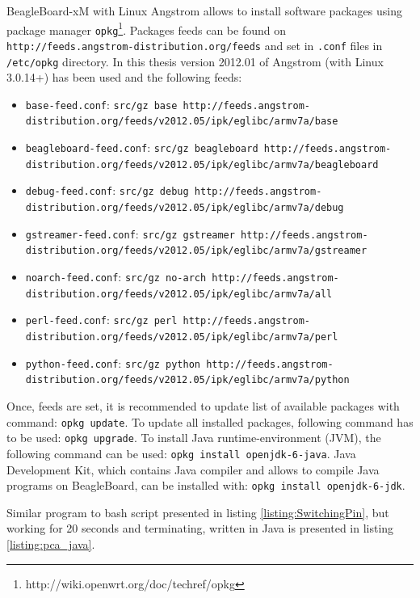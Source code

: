 BeagleBoard-xM with Linux Angstrom allows to install software packages using package manager \lstinline{opkg}\footnote{http://wiki.openwrt.org/doc/techref/opkg}. Packages feeds can be found on \lstinline{http://feeds.angstrom-distribution.org/feeds} and set in \lstinline{.conf} files in \lstinline{/etc/opkg} directory. In this thesis version 2012.01 of Angstrom (with Linux 3.0.14+) has been used and the following feeds:
\begin{itemize}
	\item \lstinline{base-feed.conf}: \lstinline{src/gz base http://feeds.angstrom-distribution.org/feeds/v2012.05/ipk/eglibc/armv7a/base}
	\item \lstinline{beagleboard-feed.conf}: \lstinline{src/gz beagleboard http://feeds.angstrom-distribution.org/feeds/v2012.05/ipk/eglibc/armv7a/beagleboard}
	\item \lstinline{debug-feed.conf}: \lstinline{src/gz debug http://feeds.angstrom-distribution.org/feeds/v2012.05/ipk/eglibc/armv7a/debug}
	\item \lstinline{gstreamer-feed.conf}: \lstinline{src/gz gstreamer http://feeds.angstrom-distribution.org/feeds/v2012.05/ipk/eglibc/armv7a/gstreamer}
	\item \lstinline{noarch-feed.conf}: \lstinline{src/gz no-arch http://feeds.angstrom-distribution.org/feeds/v2012.05/ipk/eglibc/armv7a/all}
	\item \lstinline{perl-feed.conf}: \lstinline{src/gz perl http://feeds.angstrom-distribution.org/feeds/v2012.05/ipk/eglibc/armv7a/perl}
	\item \lstinline{python-feed.conf}: \lstinline{src/gz python http://feeds.angstrom-distribution.org/feeds/v2012.05/ipk/eglibc/armv7a/python}
\end{itemize}

Once, feeds are set, it is recommended to update list of available packages with command: \lstinline{opkg update}. To update all installed packages, following command has to be used: \lstinline{opkg upgrade}. To install Java runtime-environment (JVM), the following command can be used: \lstinline{opkg install openjdk-6-java}. Java Development Kit, which contains Java compiler and allows to compile Java programs on BeagleBoard, can be installed with: \lstinline{opkg install openjdk-6-jdk}.

Similar program to bash script presented in listing \ref{listing:SwitchingPin}, but working for 20 seconds and terminating, written in Java is presented in listing \ref{listing:pca_java}. 

